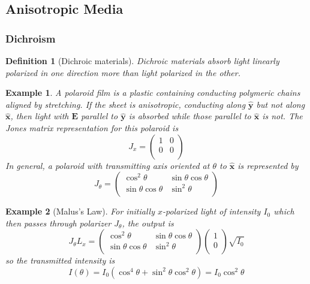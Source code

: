 \documentclass[a4paper]{article}
\newtheorem{defi}{Definition}[section]
\newtheorem{eg}{Example}[section]
\theoremstyle{new}
\begin{document}
\subsection{Anisotropic Media}
\subsubsection{Dichroism}
\begin{defi}[Dichroic materials]
Dichroic materials absorb light linearly polarized in one direction more than light polarized in the other.
\end{defi}
\begin{eg}
A polaroid film is a plastic containing conducting polymeric chains aligned by stretching. If the sheet is anisotropic, conducting along $\mathbf{\hat{y}}$ but not along $\mathbf{\hat{x}}$, then light with $\mathbf{E}$ parallel to $\mathbf{\hat{y}}$ is absorbed while those parallel to $\mathbf{\hat{x}}$ is not. The Jones matrix representation for this polaroid is
$$J_x=\begin{pmatrix}1&0\\0&0\\\end{pmatrix}$$
In general, a polaroid with transmitting axis oriented at $\theta$ to $\mathbf{\hat{x}}$ is represented by
$$J_\theta=\begin{pmatrix}\cos^2\theta&\sin\theta\cos\theta\\\sin\theta\cos\theta&\sin^2\theta\\\end{pmatrix}$$
\end{eg}
\begin{eg}[Malus's Law]
For initially $x$-polarized light of intensity $I_0$ which then passes through polarizer $J_\theta$, the output is
$$J_\theta L_x=\begin{pmatrix}\cos^2\theta&\sin\theta\cos\theta\\\sin\theta\cos\theta&\sin^2\theta\\\end{pmatrix}\begin{pmatrix}1\\0\\\end{pmatrix}\sqrt{I_0}$$
so the transmitted intensity is
$$I(\theta)=I_0(\cos^4\theta+\sin^2\theta\cos^2\theta)=I_0\cos^2\theta$$
\end{eg}
\end{document}
